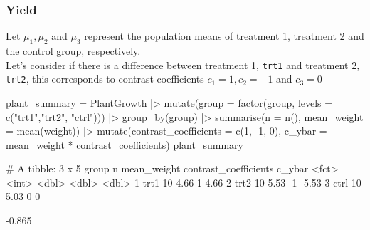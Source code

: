 \documentclass[a4paper]{article}\usepackage[]{graphicx}\usepackage[]{xcolor}
\begin{document}
\subsubsection{Yield}
Let \( \mu_1,\mu_2 \) and \( \mu_3 \) represent the population means of treatment 1, treatment 2 and the control group, respectively.\\
Let's consider if there is a difference between treatment 1, \lstinline|trt1| and treatment 2, \lstinline|trt2|, this corresponds to contrast coefficients \( c_1 = 1, c_2 = -1 \) and \( c_3 = 0 \)
\begin{Schunk}
\begin{Sinput}
plant_summary = PlantGrowth |> 
  mutate(group = factor(group, levels = c("trt1","trt2", "ctrl"))) |> 
  group_by(group) |> 
  summarise(n = n(), mean_weight = mean(weight)) |> 
  mutate(contrast_coefficients = c(1, -1, 0),
         c_ybar = mean_weight * contrast_coefficients)
plant_summary
\end{Sinput}
\begin{Soutput}
# A tibble: 3 x 5
  group     n mean_weight contrast_coefficients c_ybar
  <fct> <int>       <dbl>                 <dbl>  <dbl>
1 trt1     10        4.66                     1   4.66
2 trt2     10        5.53                    -1  -5.53
3 ctrl     10        5.03                     0   0   
\end{Soutput}
\begin{Soutput}
[1] -0.865
\end{Soutput}
\end{Schunk}
\end{document}
